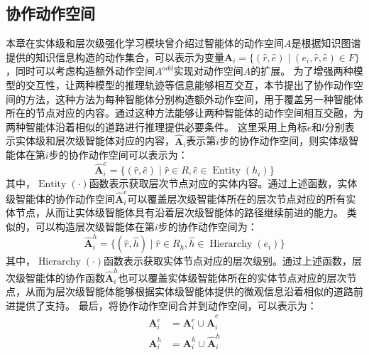 \documentclass[algorithmlist, AutoFakeBold, AutoFakeSlant, figurelist, tablelist, nomlist, engineering]{seuthesix}
\begin{document}
\subsection{协作动作空间}
本章在实体级和层次级强化学习模块曾介绍过智能体的动作空间$A$是根据知识图谱提供的知识信息构造的动作集合，可以表示为变量$\bm{A}_i = \{(\hat{r}, \hat{e}) \mid (e_i, \hat{r}, \hat{e}) \in F\}$，同时可以考虑构造额外动作空间$A^{add}$实现对动作空间$A$的扩展。
为了增强两种模型的交互性，让两种模型的推理轨迹等信息能够相互交互，本节提出了协作动作空间的方法，这种方法为每种智能体分别构造额外动作空间，用于覆盖另一种智能体所在的节点对应的内容。通过这种方法能够让两种智能体的动作空间相互交融，为两种智能体沿着相似的道路进行推理提供必要条件。
这里采用上角标$e$和$l$分别表示实体级和层次级智能体对应的内容，$\bm{\hat{A}}_i$表示第$i$步的协作动作空间，则实体级智能体在第$i$步的协作动作空间可以表示为：
\begin{equation}
  \bm{\hat{A}}_i^{e} = \{(\hat{r}, \hat{e}) \mid \hat{r} \in R, \hat{e} \in \operatorname{Entity}(h_i)\}
  \label{coo_1}
\end{equation}
其中，$\operatorname{Entity}(\cdot)$函数表示获取层次节点对应的实体内容。通过上述函数，实体级智能体的协作动作空间$\bm{\hat{A}}_i^{e}$可以覆盖层次级智能体所在的层次节点对应的所有实体节点，从而让实体级智能体具有沿着层次级智能体的路径继续前进的能力。
类似的，可以构造层次级智能体在第$i$步的协作动作空间为：
\begin{equation}
  \bm{\hat{A}}_i^{h} = \{(\hat{r}, \hat{h}) \mid \hat{r} \in R_h, \hat{h} \in \operatorname{Hierarchy}(e_i)\}
  \label{coo_2}
\end{equation}
其中，$\operatorname{Hierarchy}(\cdot)$函数表示获取实体节点对应的层次级别。通过上述函数，层次级智能体的协作函数$\bm{\hat{A}}_i^{h}$也可以覆盖实体级智能体所在的实体节点对应的层次节点，从而为层次级智能体能够根据实体级智能体提供的微观信息沿着相似的道路前进提供了支持。
最后，将协作动作空间合并到动作空间，可以表示为：
\begin{equation}
  \begin{aligned}
    \bm{A}_i^{e} &= \bm{A}_i^{e} \cup \bm{\hat{A}}_i^{e} \\
    \bm{A}_i^{h} &= \bm{A}_i^{h} \cup \bm{\hat{A}}_i^{h}
  \end{aligned}
\end{equation}
\end{document}
